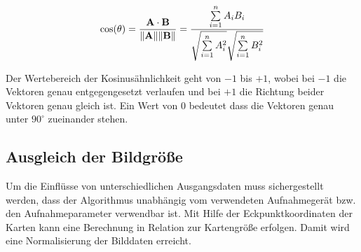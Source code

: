 \begin{equation}
\label{eq:cosinesimilarity}
\cos(\theta) = {\mathbf{A} \cdot \mathbf{B} \over \|\mathbf{A}\| \|\mathbf{B}\|} = \frac{ \sum\limits_{i=1}^{n}{A_i  B_i} }{ \sqrt{\sum\limits_{i=1}^{n}{A_i^2}}  \sqrt{\sum\limits_{i=1}^{n}{B_i^2}} }
\end{equation}

Der Wertebereich der Kosinusähnlichkeit geht von $-1$ bis $+1$, wobei bei $-1$ die Vektoren genau entgegengesetzt verlaufen und bei $+1$ die Richtung beider Vektoren genau gleich ist. Ein Wert von $0$ bedeutet dass die Vektoren genau unter $90^{\circ}$ zueinander stehen.
\subsection{Ausgleich der Bildgröße}
\label{sub:grunddaten}
Um die Einflüsse von unterschiedlichen Ausgangsdaten muss sichergestellt werden, dass der Algorithmus unabhängig vom verwendeten Aufnahmegerät bzw. den Aufnahmeparameter verwendbar ist.
Mit Hilfe der Eckpunktkoordinaten der Karten kann eine Berechnung in Relation zur Kartengröße erfolgen. Damit wird eine Normalisierung der Bilddaten erreicht.



